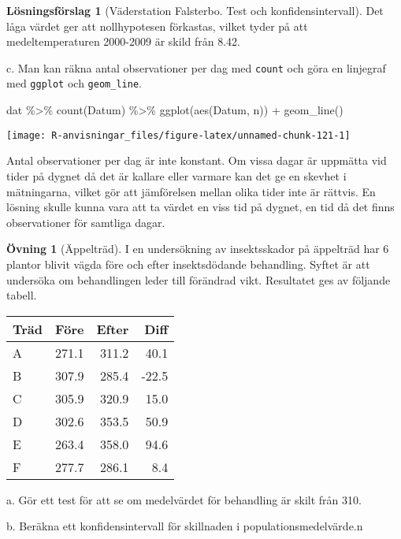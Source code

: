 \documentclass[
]{book}
\newenvironment{Shaded}{\begin{snugshade}}{\end{snugshade}}
\newcommand{\FunctionTok}[1]{\textcolor[rgb]{0.00,0.00,0.00}{#1}}
\newcommand{\NormalTok}[1]{#1}
\newcommand{\SpecialCharTok}[1]{\textcolor[rgb]{0.00,0.00,0.00}{#1}}
\theoremstyle{definition}
\theoremstyle{definition}
\theoremstyle{definition}
\newtheorem{exercise}{Övning}[chapter]
\theoremstyle{definition}
\newtheorem{hypothesis}{Lösningsförslag}[chapter]
\theoremstyle{remark}
\begin{document}
\begin{hypothesis}[Väderstation Falsterbo. Test och konfidensintervall]
Det låga värdet ger att nollhypotesen förkastas, vilket tyder på att medeltemperaturen 2000-2009 är skild från 8.42.

c. Man kan räkna antal observationer per dag med \texttt{count} och göra en linjegraf med \texttt{ggplot} och \texttt{geom\_line}.

\begin{Shaded}
\begin{Highlighting}[]
\NormalTok{dat }\SpecialCharTok{\%\textgreater{}\%} \FunctionTok{count}\NormalTok{(Datum) }\SpecialCharTok{\%\textgreater{}\%} \FunctionTok{ggplot}\NormalTok{(}\FunctionTok{aes}\NormalTok{(Datum, n)) }\SpecialCharTok{+} \FunctionTok{geom\_line}\NormalTok{()}
\end{Highlighting}
\end{Shaded}

\begin{center}\texttt{[image: R-anvisningar\_files/figure-latex/unnamed-chunk-121-1]} \end{center}

Antal observationer per dag är inte konstant. Om vissa dagar är uppmätta vid tider på dygnet då det är kallare eller varmare kan det ge en skevhet i mätningarna, vilket gör att jämförelsen mellan olika tider inte är rättvis. En lösning skulle kunna vara att ta värdet en viss tid på dygnet, en tid då det finns observationer för samtliga dagar.
\end{hypothesis}

\begin{exercise}[Äppelträd]
I en undersökning av insektsskador på äppelträd har 6 plantor blivit vägda före och efter insektsdödande behandling. Syftet är att undersöka om behandlingen leder till förändrad vikt. Resultatet ges av följande tabell.

\begin{table}
\centering
\begin{tabular}[t]{lrrr}
\toprule
Träd & Före & Efter & Diff\\
\midrule
A & 271.1 & 311.2 & 40.1\\
B & 307.9 & 285.4 & -22.5\\
C & 305.9 & 320.9 & 15.0\\
D & 302.6 & 353.5 & 50.9\\
E & 263.4 & 358.0 & 94.6\\
\addlinespace
F & 277.7 & 286.1 & 8.4\\
\bottomrule
\end{tabular}
\end{table}

a. Gör ett test för att se om medelvärdet för behandling är skilt från 310.

b. Beräkna ett konfidensintervall för skillnaden i populationsmedelvärde.n
\end{exercise}
\end{document}
